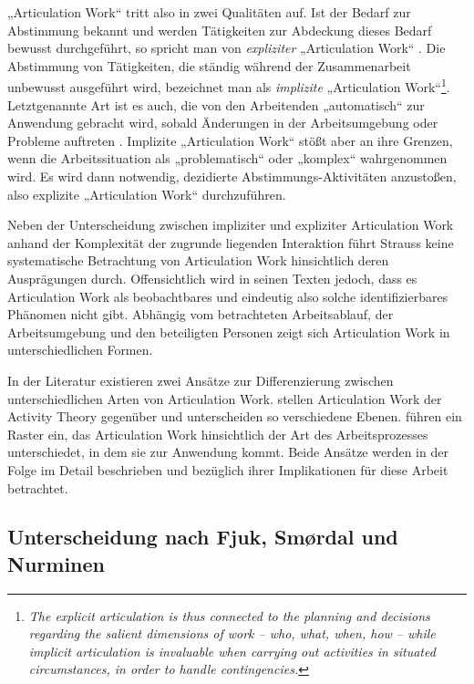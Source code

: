 „Articulation Work“ tritt also in zwei Qualitäten auf. Ist der Bedarf zur Abstimmung bekannt und werden Tätigkeiten zur Abdeckung dieses Bedarf bewusst durchgeführt, so spricht man von \emph{expliziter} „Articulation Work“ \citep{Strauss88} \citep{Fjuk97}. Die Abstimmung von Tätigkeiten, die ständig während der Zusammenarbeit unbewusst ausgeführt wird, bezeichnet man als \emph{implizite} „Articulation Work“\footnote{\emph{The explicit articulation is thus connected to the planning and decisions regarding the salient dimensions of work -- who, what, when, how -- while implicit articulation is invaluable when carrying out activities in situated circumstances, in order to handle contingencies.}\citep[][S.5]{Fjuk97}}. Letztgenannte Art ist es auch, die von den Arbeitenden „automatisch“ zur Anwendung gebracht wird, sobald Änderungen in der Arbeitsumgebung oder Probleme auftreten \citep{Strauss88}. Implizite „Articulation Work“ stößt aber an ihre Grenzen, wenn die Arbeitssituation als „problematisch“ \citep{Strauss88} oder „komplex“ \citep[][S. 23f]{Schmidt90} wahrgenommen wird. Es wird dann notwendig, dezidierte Abstimmungs-Aktivitäten anzustoßen, also explizite „Articulation Work“ durchzuführen.

Neben der Unterscheidung zwischen impliziter und expliziter Articulation Work anhand der Komplexität der zugrunde liegenden Interaktion führt Strauss keine systematische Betrachtung von Articulation Work hinsichtlich deren Ausprägungen durch. Offensichtlich wird in seinen Texten jedoch, dass es Articulation Work als beobachtbares und eindeutig also solche identifizierbares Phänomen nicht gibt. Abhängig vom betrachteten Arbeitsablauf, der Arbeitsumgebung und den beteiligten Personen zeigt sich Articulation Work in unterschiedlichen Formen.

In der Literatur existieren zwei Ansätze zur Differenzierung zwischen unterschiedlichen Arten von Articulation Work. \citet{Fjuk97} stellen Articulation Work der Activity Theory \citep{Leontev78} gegenüber und unterscheiden so verschiedene Ebenen. \citet{Hampson05} führen ein Raster ein, das Articulation Work hinsichtlich der Art des Arbeitsprozesses unterschiedet, in dem sie zur Anwendung kommt. Beide Ansätze werden in der Folge im Detail beschrieben und bezüglich ihrer Implikationen für diese Arbeit betrachtet.

\subsection{Unterscheidung nach Fjuk, Smørdal und Nurminen}
\label{sub:arten_fjuk}

